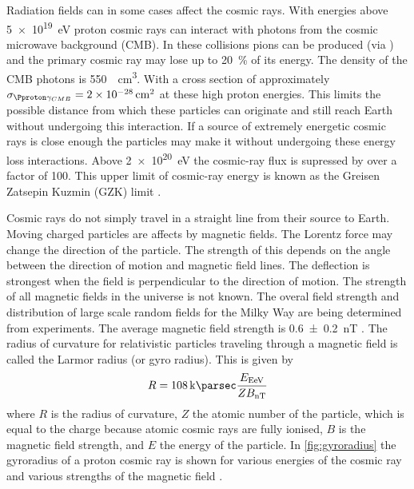 Radiation fields can in some cases affect the cosmic rays. With energies above \SI{5e19}{\eV} proton cosmic rays can interact with photons from the cosmic microwave background (CMB). In these collisions pions can be produced (via \PDelta) and the primary cosmic ray may lose up to \SI{20}{\percent} of its energy. The density of the CMB photons is \SI{550}{\per\centi\meter\cubed}. With a cross section of approximately $\sigma_{\Pproton \gamma_{CMB}} = \SI{2e-28}{\centi\meter\squared}$ at these high proton energies. This limits the possible distance from which these particles can originate and still reach Earth without undergoing this interaction. If a source of extremely energetic cosmic rays is close enough the particles may make it without undergoing these energy loss interactions. Above \SI{2e20}{\eV} the cosmic-ray flux is supressed by over a factor of 100. This upper limit of cosmic-ray energy is known as the Greisen Zatsepin Kuzmin (GZK) limit \cite{zatsepin1966gzk,greisen1966gzk}.

Cosmic rays do not simply travel in a straight line from their source to Earth. Moving charged particles are affects by magnetic fields. The Lorentz force may change the direction of the particle. The strength of this depends on the angle between the direction of motion and magnetic field lines. The deflection is strongest when the field is perpendicular to the direction of motion. The strength of all magnetic fields in the universe is not known. The overal field strength and distribution of large scale random fields for the Milky Way are being determined from experiments. The average magnetic field strength is \SI{0.6 \pm .2}{\nano\tesla} \cite{jansson2010magnetic}. The radius of curvature for relativistic particles traveling through a magnetic field is called the Larmor radius (or gyro radius). This is given by
%
\begin{equation}
    R = \SI{108}{\kilo\parsec}
        \frac{E_{\si{\exa\eV}}}{Z B_{\si{\nano\tesla}}}
\end{equation}
%
where $R$ is the radius of curvature, $Z$ the atomic number of the particle, which is equal to the charge because atomic cosmic rays are fully ionised, $B$ is the magnetic field strength, and $E$ the energy of the particle. In \cref{fig:gyroradius} the gyroradius of a proton cosmic ray is shown for various energies of the cosmic ray and various strengths of the magnetic field \cite{grigat2011anisotropy}.

